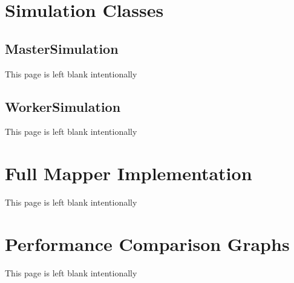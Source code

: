 \documentclass[12pt]{report}
\begin{document}
\begin{appendices}

\chapter{Simulation Classes}
\section{MasterSimulation}
%
\clearpage
This page is left blank intentionally
%
\clearpage
\section{WorkerSimulation}
%
\clearpage
This page is left blank intentionally
%
\clearpage
\chapter{Full Mapper Implementation}
%
\clearpage
This page is left blank intentionally
%
\clearpage
\chapter{Performance Comparison Graphs}
\clearpage
This page is left blank intentionally

\end{appendices}
\end{document}
